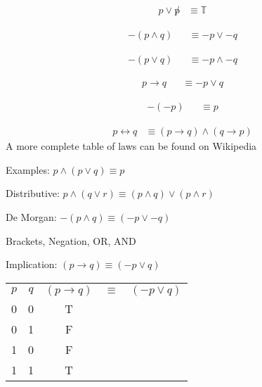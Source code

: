 \begin{align}
  p \lor \not p & \equiv \mathbb{T}
  \label{eq:Inv2}
\end{align}

\begin{align}
  -(p \land q) &
    & \equiv -p \lor -q
  \label{eq:deMorgan}
\end{align}

\begin{align}
  -(p \lor q) &
    & \equiv -p \land -q
  \label{eq:deMorgan2}
\end{align}

\begin{align}
  p \to q &
    & \equiv -p \lor q
  \label{eq:Impl}
\end{align}

\begin{align}
  -(-p) &
    & \equiv p
  \label{eq:2Neg}
\end{align}

\begin{align}
  p \leftrightarrow q
    & \equiv (p \to q) \land (q \to p)
  \label{eq:Equiv}
\end{align}
A more complete table of laws can be found on Wikipedia 


Examples:
$ p \land (p \lor q) \equiv p$

Distributive:
$ p \land (q \lor r) \equiv (p \land q) \lor (p \land r)$

De Morgan:
$ -(p \land q) \equiv (-p \lor -q)$
  
Brackets, Negation, OR, AND

Implication:
$ (p \to q) \equiv (-p \lor q)$
\begin{table}[!htb]
\label{tab:TruthTableTautology}
\begin{tabularx}{\linewidth}{| c | c | c | c | c |} \hline
  $p$ & $q$ & $(p \to q)$ & $\equiv$ & $(-p \lor q)$ \\
  0   &   0 &           T &          & \\
  0   &   1 &           F &          & \\
  1   &   0 &           F &          & \\
  1   &   1 &           T &          & \\
\end{tabularx}
\end{table}

